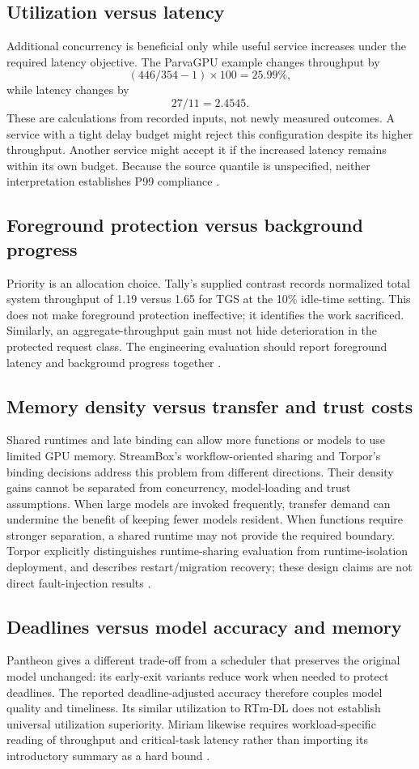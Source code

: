 \subsection{Utilization versus latency}
Additional concurrency is beneficial only while useful service increases under the required latency objective. The ParvaGPU example changes throughput by
\[ (446/354-1)\times100 = 25.99\%, \]
while latency changes by
\[ 27/11 = 2.4545. \]
These are calculations from recorded inputs, not newly measured outcomes. A service with a tight delay budget might reject this configuration despite its higher throughput. Another service might accept it if the increased latency remains within its own budget. Because the source quantile is unspecified, neither interpretation establishes P99 compliance \cite{P011}.

\subsection{Foreground protection versus background progress}
Priority is an allocation choice. Tally's supplied contrast records normalized total system throughput of 1.19 versus 1.65 for TGS at the 10\% idle-time setting. This does not make foreground protection ineffective; it identifies the work sacrificed. Similarly, an aggregate-throughput gain must not hide deterioration in the protected request class. The engineering evaluation should report foreground latency and background progress together \cite{P022}.

\subsection{Memory density versus transfer and trust costs}
Shared runtimes and late binding can allow more functions or models to use limited GPU memory. StreamBox's workflow-oriented sharing and Torpor's binding decisions address this problem from different directions. Their density gains cannot be separated from concurrency, model-loading and trust assumptions. When large models are invoked frequently, transfer demand can undermine the benefit of keeping fewer models resident. When functions require stronger separation, a shared runtime may not provide the required boundary. Torpor explicitly distinguishes runtime-sharing evaluation from runtime-isolation deployment, and describes restart/migration recovery; these design claims are not direct fault-injection results \cite{P012,P013}.

\subsection{Deadlines versus model accuracy and memory}
Pantheon gives a different trade-off from a scheduler that preserves the original model unchanged: its early-exit variants reduce work when needed to protect deadlines. The reported deadline-adjusted accuracy therefore couples model quality and timeliness. Its similar utilization to RTm-DL does not establish universal utilization superiority. Miriam likewise requires workload-specific reading of throughput and critical-task latency rather than importing its introductory summary as a hard bound \cite{s023,s025}.

